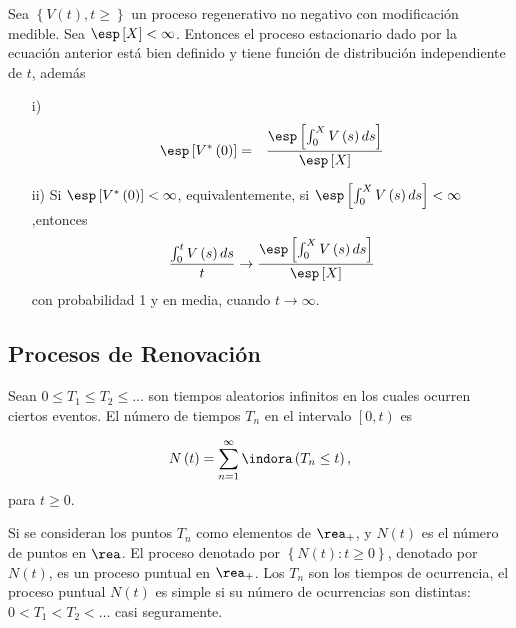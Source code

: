 \begin{Teo}
Sea $\left\{V\left(t\right),t\geq\right\}$ un proceso regenerativo no negativo con modificaci\'on medible. Sea $\esp\left[X\right]<\infty$. Entonces el proceso estacionario dado por la ecuaci\'on anterior est\'a bien definido y tiene funci\'on de distribuci\'on independiente de $t$, adem\'as
\begin{itemize}
\item[i)] \begin{eqnarray*}
\esp\left[V^{*}\left(0\right)\right]&=&\frac{\esp\left[\int_{0}^{X}V\left(s\right)ds\right]}{\esp\left[X\right]}\end{eqnarray*}
\item[ii)] Si $\esp\left[V^{*}\left(0\right)\right]<\infty$, equivalentemente, si $\esp\left[\int_{0}^{X}V\left(s\right)ds\right]<\infty$,entonces
\begin{eqnarray*}
\frac{\int_{0}^{t}V\left(s\right)ds}{t}\rightarrow\frac{\esp\left[\int_{0}^{X}V\left(s\right)ds\right]}{\esp\left[X\right]}
\end{eqnarray*}
con probabilidad 1 y en media, cuando $t\rightarrow\infty$.
\end{itemize}
\end{Teo}

\subsection{Procesos de Renovaci\'on}

\begin{Def}\label{Def.Tn}
Sean $0\leq T_{1}\leq T_{2}\leq \ldots$ son tiempos aleatorios infinitos en los cuales ocurren ciertos eventos. El n\'umero de tiempos $T_{n}$ en el intervalo $\left[0,t\right)$ es

\begin{eqnarray}
N\left(t\right)=\sum_{n=1}^{\infty}\indora\left(T_{n}\leq t\right),
\end{eqnarray}
para $t\geq0$.
\end{Def}

Si se consideran los puntos $T_{n}$ como elementos de $\rea_{+}$, y $N\left(t\right)$ es el n\'umero de puntos en $\rea$. El proceso denotado por $\left\{N\left(t\right):t\geq0\right\}$, denotado por $N\left(t\right)$, es un proceso puntual en $\rea_{+}$. Los $T_{n}$ son los tiempos de ocurrencia, el proceso puntual $N\left(t\right)$ es simple si su n\'umero de ocurrencias son distintas: $0<T_{1}<T_{2}<\ldots$ casi seguramente.

